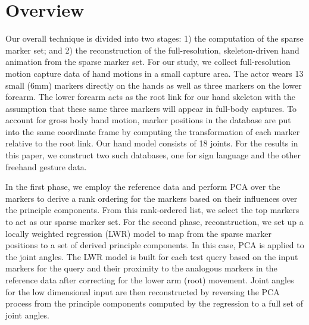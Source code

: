 
\section{Overview}

Our overall technique is divided into two stages: 1) the computation of the sparse marker set; and 2) the reconstruction of the full-resolution, skeleton-driven hand animation from the sparse marker set. 
For our study, we collect full-resolution motion capture data of hand motions in a small capture
area. 
The actor wears 13 small (6mm) markers directly on the hands as well as three markers on the lower forearm. The lower forearm acts as the root link for our hand skeleton with the assumption that these same three markers will appear in full-body captures. 
To account for gross body hand motion, marker positions in the database are put into the same coordinate frame by computing the transformation of each marker relative to the root link. Our hand model consists of 18 joints. %
For the results in this paper, we construct two such databases, one for sign language and the other freehand gesture data.

In the first phase, we employ the reference data and perform PCA over the markers to derive a rank ordering for the markers based on their influences over the principle components. From this rank-ordered list, we select the top markers to act as our sparse marker set.
For the second phase, reconstruction, we set up a locally weighted regression (LWR) model to map from the sparse marker positions to a set of derived principle components.  In this case, PCA is applied to the joint angles. The LWR model is built for each test query based on the input markers for the query and their proximity to the analogous markers in the reference data after correcting for the lower arm (root) movement.
%
Joint angles for the low dimensional input are then reconstructed by reversing the PCA process from
the principle components computed by the regression to a full set of joint angles. 
